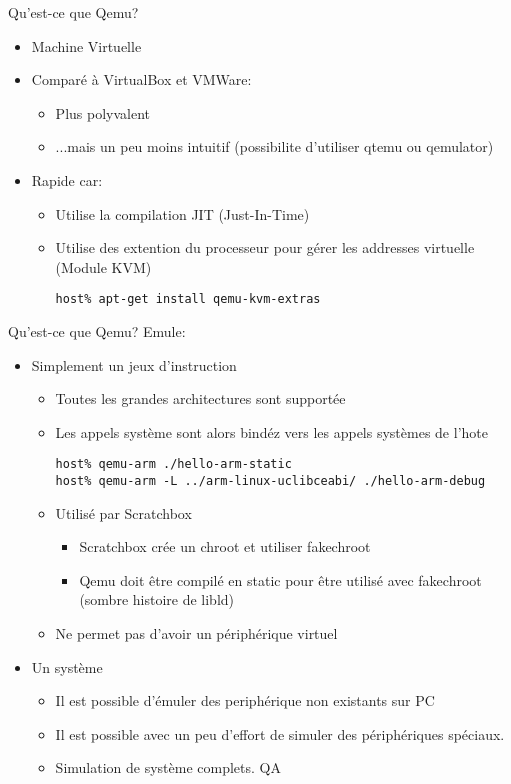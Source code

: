 \begin{frame}[fragile=singleslide]{Qu'est-ce que Qemu?}
  \begin{itemize}
  \item Machine Virtuelle
  \item Comparé à VirtualBox et VMWare:
    \begin{itemize}
    \item Plus polyvalent
    \item ...mais un peu  moins intuitif (possibilite d'utiliser qtemu
      ou qemulator)
    \end{itemize}
  \item Rapide car:
    \begin{itemize}
    \item Utilise la compilation JIT (Just-In-Time)
    \item Utilise des extention du processeur pour gérer les
      addresses virtuelle (Module KVM)
      \begin{lstlisting}
host% apt-get install qemu-kvm-extras
      \end{lstlisting}
    \end{itemize}
  \end{itemize}
\end{frame}

\begin{frame}[fragile=singleslide]{Qu'est-ce que Qemu?}
  Emule:
  \begin{itemize}
  \item Simplement un jeux d'instruction 
    \begin{itemize}
    \item Toutes les grandes architectures sont supportée
    \item  Les  appels  système  sont  alors bindéz  vers  les  appels
      systèmes de l'hote
      \begin{lstlisting}
host% qemu-arm ./hello-arm-static
host% qemu-arm -L ../arm-linux-uclibceabi/ ./hello-arm-debug
      \end{lstlisting}
    \item Utilisé par Scratchbox
      \begin{itemize}
      \item Scratchbox crée un chroot et utiliser fakechroot
      \item Qemu  doit être compilé  en static pour être  utilisé avec
        fakechroot (sombre histoire de libld) %
      \end{itemize}
    \item Ne permet pas d'avoir un périphérique virtuel
    \end{itemize}
  \item Un système
    \begin{itemize}
    \item Il est possible  d'émuler des periphérique non existants sur
      PC
    \item  Il  est  possible  avec  un peu  d'effort  de  simuler  des
      périphériques spéciaux.
    \item Simulation de système complets. QA
    \end{itemize}
  \end{itemize}
\end{frame}

